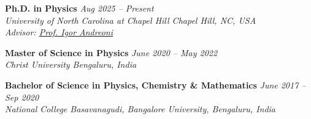 \textbf{Ph.D. in Physics} \hfill \textit{Aug 2025 -- Present} \\
\textit{University of North Carolina at Chapel Hill \hfill Chapel Hill, NC, USA \\
Advisor: \href{https://physics.unc.edu/people/igor-andreoni/}{Prof. Igor Andreoni}}

\vspace{0.5em}

\textbf{Master of Science in Physics} \hfill \textit{June 2020 -- May 2022} \\
\textit{Christ University \hfill Bengaluru, India} \\


\vspace{0.5em}

\textbf{Bachelor of Science in Physics, Chemistry \& Mathematics} \hfill \textit{June 2017 -- Sep 2020} \\
\textit{National College Basavanagudi, Bangalore University, \hfill Bengaluru, India} \\